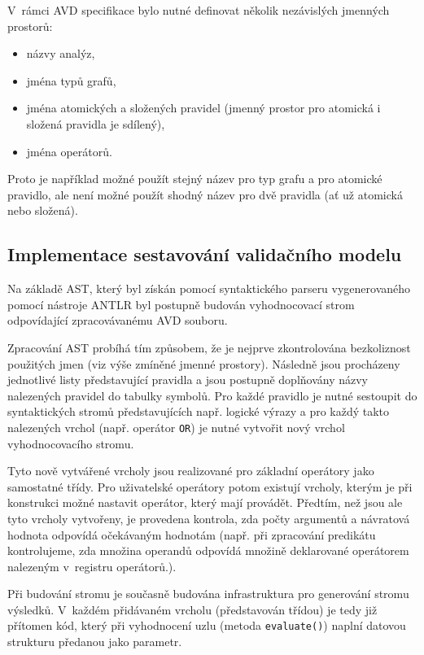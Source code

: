 V~rámci AVD specifikace bylo nutné definovat několik nezávislých jmenných prostorů:

\begin{itemize}
\item názvy analýz,
\item jména typů grafů,
\item jména atomických a složených pravidel (jmenný prostor pro atomická i složená pravidla je sdílený),
\item jména operátorů.
\end{itemize}

Proto je například možné použít stejný název pro typ grafu a pro atomické pravidlo, ale není možné použít shodný název pro dvě pravidla (ať už atomická nebo složená).

\subsection{Implementace sestavování validačního modelu}
Na základě AST, který byl získán pomocí syntaktického parseru vygenerovaného pomocí nástroje ANTLR byl postupně budován vyhodnocovací strom odpovídající zpracovávanému AVD souboru.

Zpracování AST probíhá tím způsobem, že je nejprve zkontrolována bezkoliznost použitých jmen (viz výše zmíněné jmenné prostory). Následně jsou procházeny jednotlivé listy představující pravidla a jsou postupně doplňovány názvy nalezených pravidel do tabulky symbolů. Pro každé pravidlo je nutné sestoupit do syntaktických stromů představujících např. logické výrazy a pro každý takto nalezených vrchol (např. operátor \verb+OR+) je nutné vytvořit nový vrchol vyhodnocovacího stromu.

Tyto nově vytvářené vrcholy jsou realizované pro základní operátory jako samostatné třídy. Pro uživatelské operátory potom existují vrcholy, kterým je při konstrukci možné nastavit operátor, který mají provádět. Předtím, než jsou ale tyto vrcholy vytvořeny, je provedena kontrola, zda počty argumentů a návratová hodnota odpovídá očekávaným hodnotám (např. při zpracování predikátu kontrolujeme, zda množina operandů odpovídá množině deklarované operátorem nalezeným v~registru operátorů.).

Při budování stromu je současně budována infrastruktura pro generování stromu výsledků. V~každém přidávaném vrcholu (představován třídou) je tedy již přítomen kód, který při vyhodnocení uzlu (metoda \verb-evaluate()-) naplní datovou strukturu předanou jako parametr.

